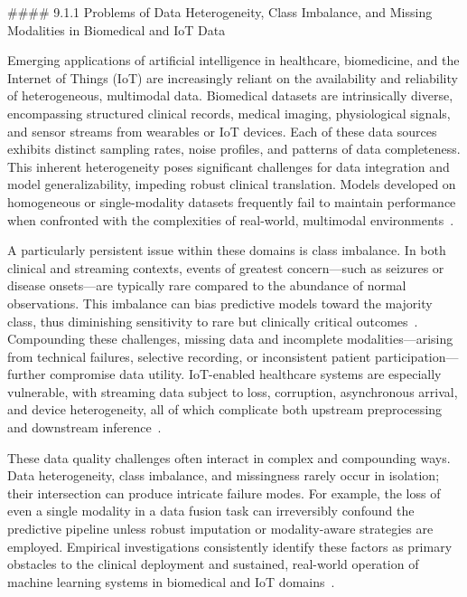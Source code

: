 \documentclass[11pt]{article}
\begin{document}
#### 9.1.1 Problems of Data Heterogeneity, Class Imbalance, and Missing Modalities in Biomedical and IoT Data

Emerging applications of artificial intelligence in healthcare, biomedicine, and the Internet of Things (IoT) are increasingly reliant on the availability and reliability of heterogeneous, multimodal data. Biomedical datasets are intrinsically diverse, encompassing structured clinical records, medical imaging, physiological signals, and sensor streams from wearables or IoT devices. Each of these data sources exhibits distinct sampling rates, noise profiles, and patterns of data completeness. This inherent heterogeneity poses significant challenges for data integration and model generalizability, impeding robust clinical translation. Models developed on homogeneous or single-modality datasets frequently fail to maintain performance when confronted with the complexities of real-world, multimodal environments~\cite{ref78,ref82,ref83}.

A particularly persistent issue within these domains is class imbalance. In both clinical and streaming contexts, events of greatest concern—such as seizures or disease onsets—are typically rare compared to the abundance of normal observations. This imbalance can bias predictive models toward the majority class, thus diminishing sensitivity to rare but clinically critical outcomes~\cite{ref83,ref84}. Compounding these challenges, missing data and incomplete modalities—arising from technical failures, selective recording, or inconsistent patient participation—further compromise data utility. IoT-enabled healthcare systems are especially vulnerable, with streaming data subject to loss, corruption, asynchronous arrival, and device heterogeneity, all of which complicate both upstream preprocessing and downstream inference~\cite{ref90,ref106}.

These data quality challenges often interact in complex and compounding ways. Data heterogeneity, class imbalance, and missingness rarely occur in isolation; their intersection can produce intricate failure modes. For example, the loss of even a single modality in a data fusion task can irreversibly confound the predictive pipeline unless robust imputation or modality-aware strategies are employed. Empirical investigations consistently identify these factors as primary obstacles to the clinical deployment and sustained, real-world operation of machine learning systems in biomedical and IoT domains~\cite{ref78,ref84,ref106}.
\end{document}

